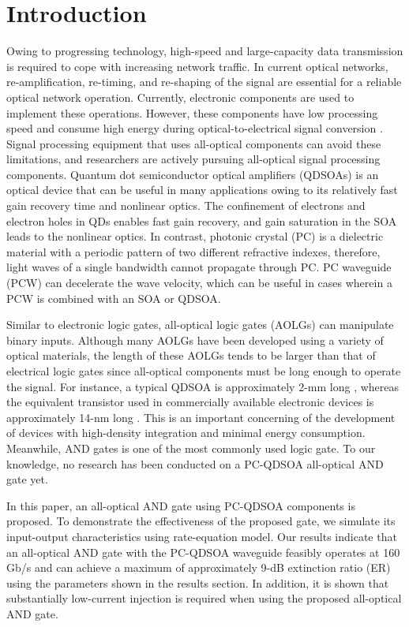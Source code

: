 \documentclass[twocolumn]{el-author}
\begin{document}
\section{Introduction}
Owing to progressing technology, high-speed and large-capacity data transmission is required to cope with increasing network traffic. In current optical networks, re-amplification, re-timing, and re-shaping of the signal are essential for a reliable optical network operation. Currently, electronic components are used to implement these operations. However, these components have low processing speed and consume high energy during optical-to-electrical signal conversion {\cite{3r_regeneration}}. Signal processing equipment that uses all-optical components can avoid these limitations, and researchers are actively pursuing all-optical signal processing components.
Quantum dot semiconductor optical amplifiers (QDSOAs) is an optical device that can be useful in many applications owing to its relatively fast gain recovery time and nonlinear optics. The confinement of electrons and electron holes in QDs enables fast gain recovery, and gain saturation in the SOA leads to the nonlinear optics.
In contrast, photonic crystal (PC) is a dielectric material with a periodic pattern of two different refractive indexes, therefore, light waves of a single bandwidth cannot propagate through PC. PC waveguide (PCW) can decelerate the wave velocity, which can be useful in cases wherein a PCW is combined with an SOA or QDSOA. \par
Similar to electronic logic gates, all-optical logic gates (AOLGs) can manipulate binary inputs. Although many AOLGs have been developed using a variety of optical materials, the length of these AOLGs tends to be larger than that of electrical logic gates since all-optical components must be long enough to operate the signal. For instance, a typical QDSOA is approximately 2-mm long {\cite{qdsoa_nssm}}, whereas the equivalent transistor used in commercially available electronic devices is approximately 14-nm long {\cite{current_cpu}}. This is an important concerning of the development of devices with high-density integration and minimal energy consumption. Meanwhile, AND gates is one of the most commonly used logic gate. To our knowledge, no research has been conducted on a PC-QDSOA all-optical AND gate yet. \par
In this paper, an all-optical AND gate using PC-QDSOA components is proposed. To demonstrate the effectiveness of the proposed gate, we simulate its input-output characteristics using rate-equation model. Our results indicate that an all-optical AND gate with the PC-QDSOA waveguide feasibly operates at 160 Gb/s and can achieve a maximum of approximately 9-dB extinction ratio (ER) using the parameters shown in the results section. In addition, it is shown that substantially low-current injection is required when using the proposed all-optical AND gate.
\end{document}
